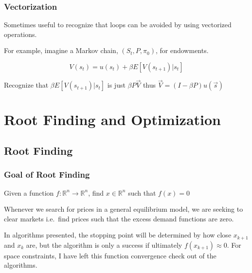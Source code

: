 \documentclass[10pt]{beamer}
\begin{document}
\begin{frame} \frametitle{Vectorization}

  Sometimes useful to recognize that loops can be avoided by using vectorized operations.

  For example, imagine a Markov chain, $(S_t, P, \pi_0)$, for endowments.

  $$V(s_t) = u(s_t) + \beta E \left[ V(s_{t+1}) | s_t \right]$$

  Recognize that $\beta E[V(s_{t+1}) | s_t]$ is just $\beta P \vec{V}$ thus $\vec{V} = (I - \beta P) u(\vec{s})$

\end{frame}


\section{Root Finding and Optimization}

\subsection{Root Finding}

\begin{frame} \frametitle{Goal of Root Finding}

  Given a function $f: \mathbb{R}^n \rightarrow \mathbb{R}^n$, find $x \in \mathbb{R}^n$ such that $f(x) = 0$

  Whenever we search for prices in a general equilibrium model, we are seeking to clear markets \textemdash{} i.e.\ find prices such that the excess demand functions are zero.

  In algorithms presented, the stopping point will be determined by how close $x_{k+1}$ and $x_k$ are, but the algorithm is only a success if ultimately $f(x_{k+1}) \approx 0$. For space constraints, I have left this function convergence check out of the algorithms.

\end{frame}
\end{document}
